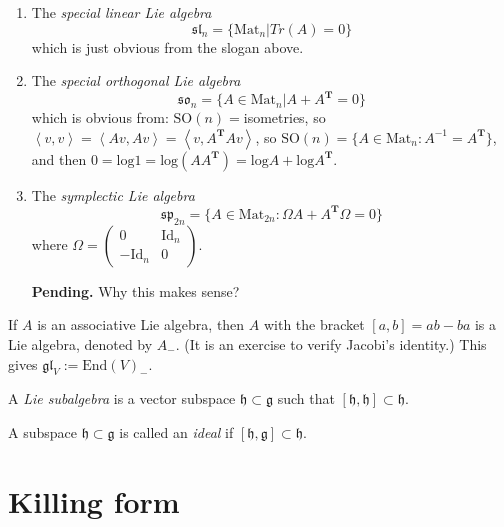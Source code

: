\begin{example}
\label{example-classical-Lie-algebras}
\begin{enumerate}
\item The {\it special linear Lie algebra} 
$$
\mathfrak{sl}_n=\{\text{Mat}_n|Tr(A)=0\}
$$
which is just obvious from the slogan above.
\item The {\it special orthogonal Lie algebra} 
$$
\mathfrak{so}_n=\{A\in \text{Mat}_n|A+A^{\mathbf{T}}=0\}
$$
which is obvious from: $\text{SO}(n)=$isometries, so
$\left<v,v\right>=\left<Av,Av\right>=\left<v,A^{\mathbf{T}}Av\right>$, so
$\text{SO}(n)=\{A \in \text{Mat}_n:A^{-1}=A^{\mathbf{T}}\}$, and then
$0=
\text{log}1=\text{log}(A A^{\mathbf{T}})=\text{log}A+\text{log}A^{\mathbf{T}}$.

\item The {\it symplectic Lie algebra}
$$
\mathfrak{sp}_{2n}=\{A \in \text{Mat}_{2n}:\Omega A+A^{\mathbf{T}}\Omega=0\}
$$
where $\Omega=\begin{pmatrix}
0&\text{Id}_n\\ 
-\text{Id}_n & 0
\end{pmatrix}$.

{\bf Pending.} Why this makes sense?
\end{enumerate}
\end{example}

\begin{example}
\label{example-associative-algebra-gives-Lie-algebra}
If $A$ is an associative Lie algebra, then $A$ with the bracket  $[a,b]=ab-ba$
is a Lie algebra, denoted by  $A_-$. (It is an exercise to verify Jacobi's
identity.) This gives  $\mathfrak{gl}_V:=\text{End}(V)_-$.
\end{example}

\begin{definition}
\label{definition-Lie-subalgebra}
A {\it Lie subalgebra} is a vector subspace $\mathfrak{h} \subset \mathfrak{g}$
such that $[\mathfrak{h},\mathfrak{h}] \subset \mathfrak{h}$.
\end{definition}

\begin{definition}
\label{definition-ideal}
A subspace $\mathfrak{h}\subset \mathfrak{g}$ is called an {\it ideal} if
$[\mathfrak{h},\mathfrak{g}]\subset\mathfrak{h}$.
\end{definition}

\section{Killing form}
\label{section-Killing-form}

